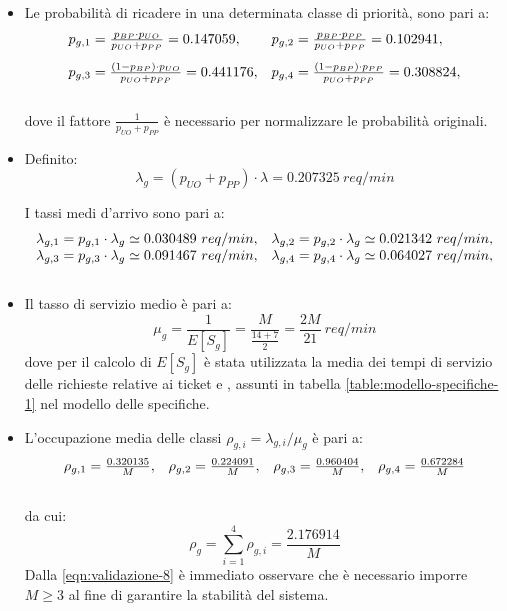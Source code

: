 \begin{itemize}
\item Le probabilità di ricadere in una determinata classe di priorità, sono pari a:
\begin{equation}
\begin{array}{l l}
p_{g,1} = \frac{p_{BP} \cdot p_{UO}}{p_{UO} + p_{PP}} = 0.147059, & p_{g,2} = \frac{p_{BP} \cdot p_{PP}}{p_{UO} + p_{PP}} = 0.102941, \\[1em]
p_{g,3} = \frac{(1-p_{BP}) \cdot p_{UO}}{p_{UO} + p_{PP}} = 0.441176, & p_{g,4} = \frac{(1-p_{BP}) \cdot p_{PP}}{p_{UO} + p_{PP}} = 0.308824, \\[1.5em]
\end{array}
\end{equation}
dove il fattore $\frac{1}{p_{UO} + p_{PP}}$ è necessario per normalizzare le probabilità originali.

\item Definito:
\begin{equation}
\lambda_g = (p_{UO} + p_{PP})\cdot \lambda = 0.207325\ req/min
\end{equation} 

I tassi medi d'arrivo sono pari a:
\begin{equation}
\begin{array}{l l}
\lambda_{g,1} = p_{g,1} \cdot \lambda_g \simeq 0.030489\ req/min, & \lambda_{g,2} = p_{g,2} \cdot \lambda_g \simeq 0.021342\ req/min, \\
\lambda_{g,3} = p_{g,3} \cdot \lambda_g \simeq 0.091467\ req/min, & \lambda_{g,4} = p_{g,4} \cdot \lambda_g \simeq 0.064027\ req/min, \\[1em]
\end{array}
\end{equation}

\item Il tasso di servizio medio è pari a:
\begin{equation}
\label{eqn:validazione-6}
\mu_g = \frac{1}{E[S_g]} = \frac{M}{\frac{14+7}{2}} = \frac{2M}{21}\ req/min
\end{equation}
dove per il calcolo di $E[S_g]$ è stata utilizzata la media dei tempi di servizio delle richieste relative ai ticket \uo{} e \pp{}, assunti in tabella \ref{table:modello-specifiche-1} nel modello delle specifiche.

\item L'occupazione media delle classi $\rho_{g,i} = \lambda_{g,i}/\mu_g$ è pari a:
\begin{equation}
\begin{array}{l l l l}
\rho_{g,1} = \frac{0.320135}{M}, & \rho_{g,2} = \frac{0.224091}{M}, & \rho_{g,3} = \frac{0.960404}{M}, & \rho_{g,4} = \frac{0.672284}{M} \\[1.5em]
\end{array}
\end{equation}
da cui:
\begin{equation}
\label{eqn:validazione-8}
\rho_g = \sum_{i=1}^4 \rho_{g,i} = \frac{2.176914}{M}
\end{equation}
Dalla \ref{eqn:validazione-8} è immediato osservare che è necessario imporre $M \geq 3$ al fine di garantire la stabilità del sistema.
\end{itemize}

